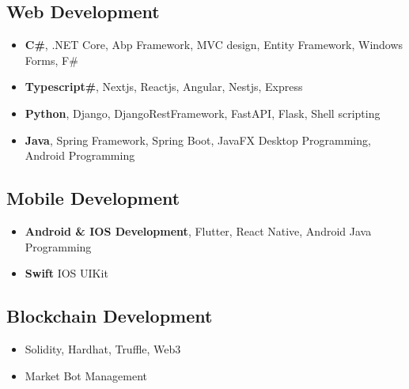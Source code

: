 \documentclass[line,margin]{res}
\begin{document}
\begin{resume}
                \subsection{Web Development}
                 \begin{itemize}  \itemsep -2pt %
                   \item \textbf{C\#}, .NET Core, Abp Framework, MVC design, Entity Framework, Windows Forms, F\#
                   \item \textbf{Typescript\#}, Nextjs, Reactjs, Angular, Nestjs, Express
                   \item \textbf{Python}, Django, DjangoRestFramework, FastAPI, Flask, Shell scripting
                   \item \textbf{Java}, Spring Framework, Spring Boot, JavaFX Desktop Programming, Android Programming
                 \end{itemize}
                 \subsection{Mobile Development}
                 \begin{itemize}  \itemsep -2pt %
                   \item \textbf{Android \& IOS Development}, Flutter, React Native, Android Java Programming
                   \item \textbf{Swift} IOS UIKit
                 \end{itemize}
                 \subsection{Blockchain Development}
                 \begin{itemize}  \itemsep -2pt %
                        \item Solidity, Hardhat, Truffle, Web3
                        \item Market Bot Management 
                 \end{itemize}

\end{resume}
\end{document}
